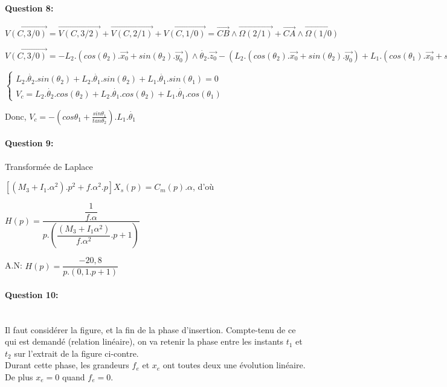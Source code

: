 \paragraph{Question 8:} $\overrightarrow{V(C,3/0)}=\overrightarrow{V(C,3/2)}+\overrightarrow{V(C,2/1)}+\overrightarrow{V(C,1/0)}=\overrightarrow{CB}\wedge \overrightarrow{\Omega(2/1)}+\overrightarrow{CA}\wedge \overrightarrow{\Omega(1/0)}$

$\overrightarrow{V(C,3/0)}=-L_2.(cos(\theta_2).\overrightarrow{x_0}+sin(\theta_2).\overrightarrow{y_0})\wedge \dot{\theta_2}.\overrightarrow{z_0}-(L_2.(cos(\theta_2).\overrightarrow{x_0}+sin(\theta_2).\overrightarrow{y_0})+L_1.(cos(\theta_1).\overrightarrow{x_0}+sin(\theta_1).\overrightarrow{y_0}))\wedge \dot{\theta_1}.\overrightarrow{z_1}$

$\left\{\begin{array}{l} L_2.\dot{\theta_2}.sin(\theta_2)+L_2.\dot{\theta_1}.sin(\theta_2)+L_1.\dot{\theta_1}.sin(\theta_1)=0 \\ V_c=L_2.\dot{\theta_2}.cos(\theta_2)+L_2.\dot{\theta_1}.cos(\theta_2)+L_1.\dot{\theta_1}.cos(\theta_1)
\end{array}\right.$

Donc,
$V_c=-\left(cos\theta_1+\frac{sin\theta_1}{tan\theta_2}\right).L_1.\dot{\theta_1}$

\paragraph{Question 9:} Transformée de Laplace

$\left[\left(M_3+I_1.\alpha^2\right).p^2+f.\alpha^2.p\right]X_s(p)=C_m(p).\alpha$, d'où

$H(p)=\dfrac{\dfrac{1}{f.\alpha}}{p.\left(\dfrac{(M_3+I_1\alpha^2)}{f.\alpha^2}.p+1 \right)}$

A.N: $H(p)=\dfrac{-20,8}{p.(0,1.p+1)}$

\paragraph{Question 10:} ~\ \\

Il faut considérer la figure, et la fin de la phase d'insertion. Compte-tenu de ce qui est demandé (relation linéaire), on va retenir la phase entre les instants $t_1$ et $t_2$ sur l'extrait de la figure ci-contre. \\
Durant cette phase, les grandeurs $f_e$ et $x_e$ ont toutes deux une évolution linéaire. De plus $x_e=0$ quand $f_e=0$.

